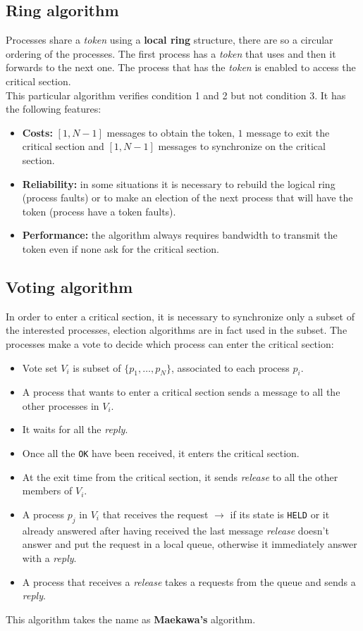 \subsection{Ring algorithm}
Processes share a \textit{token} using a \textbf{local ring} structure, there are so a circular ordering of the processes. The first process has a \textit{token} that uses and then it forwards to the next one. The process that has the \textit{token} is enabled to access the critical section.\\
This particular algorithm verifies condition 1 and 2 but not condition 3.
It has the following features:
\begin{itemize}
	\item \textbf{Costs:} $[1,N-1]$ messages to obtain the token, $1$ message to exit the critical section and $[1,N-1]$ messages to synchronize on the critical section.
	\item \textbf{Reliability:} in some situations it is necessary to rebuild the logical ring (process faults) or to make an election of the next process that will have the token (process have a token faults).
	\item \textbf{Performance:} the algorithm always requires bandwidth to transmit the token even if none ask for the critical section.
\end{itemize}

\subsection{Voting algorithm}
In order to enter a critical section, it is necessary to synchronize only a subset of the interested processes, election algorithms are in fact used in the subset. The processes make a vote to decide which process can enter the critical section:
\begin{itemize}
	\item Vote set $V_i$ is subset of $\{p_1, \dots, p_N \}$, associated to each process $p_i$.
	\item A process that wants to enter a critical section sends a message to all the other processes in $V_i$.
	\item It waits for all the \textit{reply}.
	\item Once all the \verb|OK| have been received, it enters the critical section.
	\item At the exit time from the critical section, it sends \textit{release} to all the other members of $V_i$.
	\item A process $p_j$ in $V_i$ that receives the request $\rightarrow$ if its state is \verb|HELD| or it already answered after having received the last message \textit{release} doesn't answer and put the request in a local queue, otherwise it immediately answer with a \textit{reply}.
	\item A process that receives a \textit{release} takes a requests from the queue and sends a \textit{reply}.
\end{itemize}
This algorithm takes the name as \textbf{Maekawa's} algorithm.

